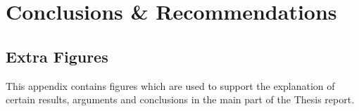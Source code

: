 \documentclass[print]{tudelft-report}
\begin{document}
\part{Conclusions \& Recommendations}



% 
%
\printbibliography[heading=bibintoc]

\begin{appendices}
  \chapter{Extra Figures}
  This appendix contains figures which are used to support the explanation of certain results, arguments and conclusions in the main part of the Thesis report.
    \begin{figure}[htb]
    \centering
    \captionsetup{justification=centering}


\end{figure}
\end{appendices}
\end{document}
